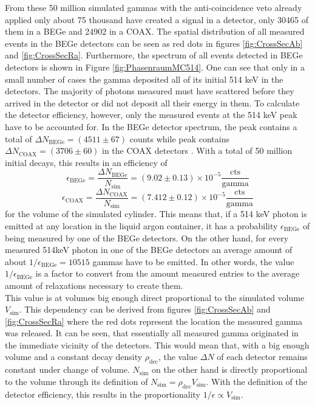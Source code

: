 \documentclass[encoding=utf8,british]{tumphthesis}
\begin{document}
From these 50 million simulated gammas with the anti-coincidence veto already applied only about 75 thousand have created a signal in a detector, only 30465 of them in a BEGe and 24902 in a COAX.
The spatial distribution of all measured events in the BEGe detectors can be seen as red dots in figures \ref{fig:CrossSecAb} and \ref{fig:CrossSecRa}.
Furthermore, the spectrum of all events detected in BEGe detectors is shown in Figure \ref{fig:PhasenraumMC514}.
One can see that only in a small number of cases the gamma deposited all of its initial 514 keV in the detectors.
The majority of photons measured must have scattered before they arrived in the detector or did not deposit all their energy in them.
To calculate the detector efficiency, however, only the measured events at the 514 keV peak have to be accounted for.
In the BEGe detector spectrum, the peak contains a total of \(\Delta N_{\mathrm{BEGe}} = (4511\pm67) \) counts while peak contains \(\Delta N_{\mathrm{COAX}} = (3706\pm60) \) in the COAX detectors .
With a total of 50 million initial decays, this results in an efficiency of 
\begin{equation*}
\epsilon_{\mathrm{BEGe}} = \frac{\Delta N_{\mathrm{BEGe}}}{N_{\mathrm{sim}}} = (9.02\pm0.13) \times 10^{-5}  \frac{\mathrm{cts}}{\mathrm{gamma}}
\end{equation*}
\begin{equation*}
\epsilon_{\mathrm{COAX}} = \frac{\Delta N_{\mathrm{COAX}}}{N_{\mathrm{sim}}} = (7.412\pm0.12) \times 10^{-5}  \frac{\mathrm{cts}}{\mathrm{gamma}}
\end{equation*}
for the volume of the simulated cylinder.
This means that, if a 514 keV photon is emitted at any location in the liquid argon container, it has a probability \(\epsilon_{\mathrm{BEGe}}\) of being measured by one of the BEGe detectors.
On the other hand, for every measured 514keV photon in one of the BEGe detectors an average amount of about $1 / \epsilon_{\mathrm{BEGe}} = 10515$ gammas have to be emitted.
In other words, the value $1 / \epsilon_{\mathrm{BEGe}}$ is a factor to convert from the amount measured entries to the average amount of  relaxations necessary to create them.
\\

This value is at volumes big enough direct proportional to the simulated volume $V_{\mathrm{sim}}$.
This dependency can be derived from figures \ref{fig:CrossSecAb} and \ref{fig:CrossSecRa} where the red dots represent the location the measured gamma was released.
It can be seen, that essentially all measured gamma originated in the immediate vicinity of the detectors.
This would mean that, with a big enough volume and a constant decay density $\rho_{\mathrm{dec}}$, the value $\Delta N$ of each detector remains constant under change of volume.
$N_{\mathrm{sim}}$ on the other hand is directly proportional to the volume through its definition of $N_{\mathrm{sim}} = \rho_{\mathrm{dec}} V_{\mathrm{sim}}$.
With the definition of the detector efficiency, this results in the proportionality  $1 / \epsilon \propto V_{\mathrm{sim}}$.
\\
\end{document}

